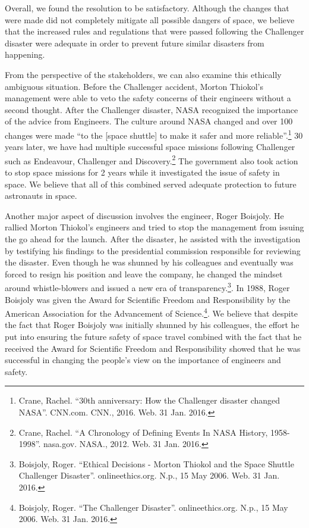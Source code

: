 \documentclass{article}
\newcommand{\q}[1]{``#1''}
\begin{document}
Overall, we found the resolution to be satisfactory. Although the changes that were made did not completely mitigate all possible dangers of space, we believe that the increased rules and regulations that were passed following the Challenger disaster were adequate in order to prevent future similar disasters from happening. \par
\vspace{5pt}
From the perspective of the stakeholders, we can also examine this ethically ambiguous situation. Before the Challenger accident, Morton Thiokol's management were able to veto the safety concerns of their engineers without a second thought. After the Challenger disaster, NASA recognized the importance of the advice from Engineers. The culture around NASA changed and over 100 changes were made \q{to the [space shuttle] to make it safer and more reliable}.\footnote{Crane, Rachel. \q{30th anniversary: How the Challenger disaster changed NASA}. CNN.com. CNN., 2016. Web. 31 Jan. 2016.} 30 years later, we have had multiple successful space missions following Challenger such as Endeavour, Challenger and Discovery.\footnote{Crane, Rachel. \q{A Chronology of Defining Events In NASA History, 1958-1998}. nasa.gov. NASA., 2012. Web. 31 Jan. 2016.} The government also took action to stop space missions for 2 years while it investigated the issue of safety in space. We believe that all of this combined served adequate protection to future astronauts in space.


Another major aspect of discussion involves the engineer, Roger Boisjoly. He rallied Morton Thiokol's engineers and tried to stop the management from issuing the go ahead for the launch. After the disaster, he assisted with the investigation by testifying his findings to the presidential commission responsible for reviewing the disaster. Even though he was shunned by his colleagues and eventually was forced to resign his position and leave the company, he changed the mindset around whistle-blowers and issued a new era of transparency.\footnote{Boisjoly, Roger. \q{Ethical Decisions - Morton Thiokol and the Space Shuttle Challenger Disaster}. onlineethics.org. N.p., 15 May 2006. Web. 31 Jan. 2016.}. In 1988, Roger Boisjoly was given the Award for Scientific Freedom and Responsibility by the American Association for the Advancement of Science.\footnote{Boisjoly, Roger. \q{The Challenger Disaster}. onlineethics.org. N.p., 15 May 2006. Web. 31 Jan. 2016.}. We believe that despite the fact that Roger Boisjoly was initially shunned by his colleagues, the effort he put into ensuring the future safety of space travel combined with the fact that he received the Award for Scientific Freedom and Responsibility showed that he was successful in changing the people's view on the importance of engineers and safety.
\end{document}
